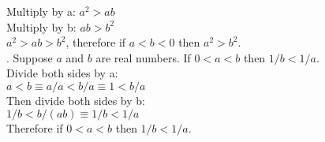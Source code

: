 \documentclass{article}
\begin{document}
Multiply by a: $a^2 > ab$\\
Multiply by b: $ab > b^2$\\
$a^2 > ab > b^2$, therefore if $a < b < 0$ then $a^2 > b^2$.\\
. Suppose $a$ and $b$ are real numbers. If $0 < a < b$ then $1/b < 1/a$. \\
Divide both sides by a:\\
$a < b \equiv a/a < b/a \equiv 1 < b/a $\\
Then divide both sides by b:\\
$1/b < b/(ab) \equiv 1/b < 1/a$\\
Therefore if $0 < a < b$ then $1/b < 1/a$.\\
\linebreak
\end{document}
